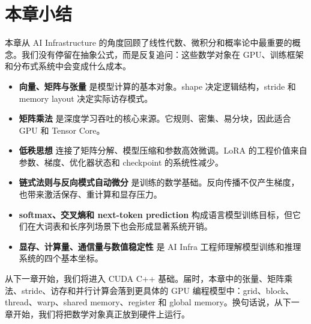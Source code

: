 \section{本章小结}
\label{sec:chapter01-summary}

本章从 AI Infrastructure 的角度回顾了线性代数、微积分和概率论中最重要的概念。我们没有停留在抽象公式，而是反复追问：这些数学对象在 GPU、训练框架和分布式系统中会变成什么成本。

\begin{itemize}
  \item \textbf{向量、矩阵与张量} 是模型计算的基本对象。shape 决定逻辑结构，stride 和 memory layout 决定实际访存模式。
  \item \textbf{矩阵乘法} 是深度学习吞吐的核心来源。它规则、密集、易分块，因此适合 GPU 和 Tensor Core。
  \item \textbf{低秩思想} 连接了矩阵分解、模型压缩和参数高效微调。LoRA 的工程价值来自参数、梯度、优化器状态和 checkpoint 的系统性减少。
  \item \textbf{链式法则与反向模式自动微分} 是训练的数学基础。反向传播不仅产生梯度，也带来激活保存、重计算和显存压力。
  \item \textbf{softmax、交叉熵和 next-token prediction} 构成语言模型训练目标，但它们在大词表和长序列场景下也会形成显著系统开销。
  \item \textbf{显存、计算量、通信量与数值稳定性} 是 AI Infra 工程师理解模型训练和推理系统的四个基本坐标。
\end{itemize}

从下一章开始，我们将进入 CUDA C++ 基础。届时，本章中的张量、矩阵乘法、stride、访存和并行计算会落到更具体的 GPU 编程模型中：grid、block、thread、warp、shared memory、register 和 global memory。换句话说，从下一章开始，我们将把数学对象真正放到硬件上运行。